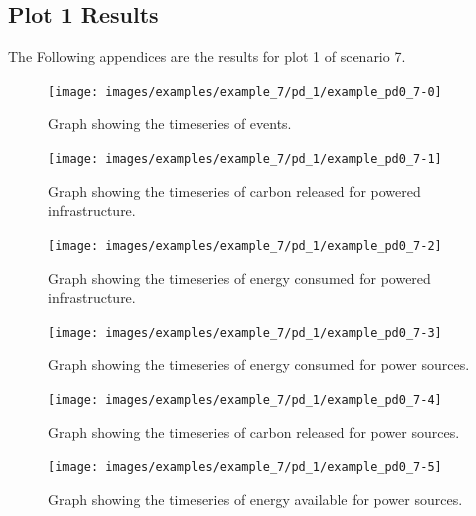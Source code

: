 \documentclass{l4proj}
\begin{document}
\begin{appendices}
\subsection{Plot 1 Results}\label{apen:subsec:scen7plot1}
The Following appendices are the results for plot 1 of scenario 7.
\clearpage
\begin{figure}[htbp]
    \centering
    \texttt{[image: images/examples/example\_7/pd\_1/example\_pd0\_7-0]}
    ~
    \caption{Graph showing the timeseries of events.}
    \label{fig:example_pd0_7-0}
\end{figure}
    \clearpage
\begin{figure}[htbp]
    \centering
    \texttt{[image: images/examples/example\_7/pd\_1/example\_pd0\_7-1]}
    ~
    \caption{Graph showing the timeseries of carbon released for powered infrastructure.}
    \label{fig:example_pd0_7-1}
\end{figure}
    \clearpage
\begin{figure}[htbp]
    \centering
    \texttt{[image: images/examples/example\_7/pd\_1/example\_pd0\_7-2]}
    ~
    \caption{Graph showing the timeseries of energy consumed for powered infrastructure.}
    \label{fig:example_pd0_7-2}
\end{figure}
    \clearpage
\begin{figure}[htbp]
    \centering
    \texttt{[image: images/examples/example\_7/pd\_1/example\_pd0\_7-3]}
    ~
    \caption{Graph showing the timeseries of energy consumed for power sources.}
    \label{fig:example_pd0_7-3}
\end{figure}
    \clearpage
\begin{figure}[htbp]
    \centering
    \texttt{[image: images/examples/example\_7/pd\_1/example\_pd0\_7-4]}
    ~
    \caption{Graph showing the timeseries of carbon released for power sources.}
    \label{fig:example_pd0_7-4}
\end{figure}
    \clearpage
\begin{figure}[htbp]
    \centering
    \texttt{[image: images/examples/example\_7/pd\_1/example\_pd0\_7-5]}
    ~
    \caption{Graph showing the timeseries of energy available for power sources.}
    \label{fig:example_pd0_7-5}
\end{figure}

\clearpage

\end{appendices}
\end{document}
